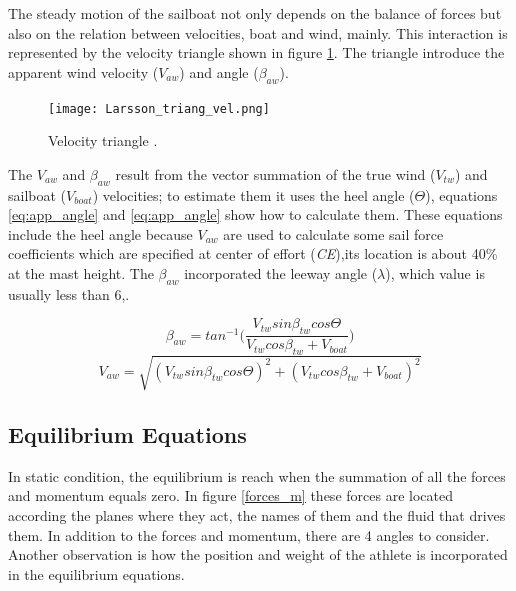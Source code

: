 The steady motion of the sailboat not only depends on the balance of forces but also on the relation between velocities, boat and wind, mainly. This interaction is represented by the velocity triangle shown in figure \ref{vel_triangle}. The triangle introduce the apparent wind velocity ($V_{aw}$) and angle ($\beta_{aw}$).\par 
\begin{figure}[ht]
\centering
  \texttt{[image: Larsson\_triang\_vel.png]}
 \caption{Velocity triangle  \cite{larsonprinciples}. }
\label{vel_triangle}
\end{figure}
The $V_{aw}$ and $\beta_{aw}$ result from the vector summation of the true wind ($V_{tw}$) and sailboat ($V_{boat}$) velocities; to estimate them it uses the heel angle ($\Theta$), equations \ref{eq:app_angle} and \ref{eq:app_angle} show how to calculate them. These equations include the heel angle because $V_{aw}$ are used to calculate some sail force coefficients which are specified at center of effort (\textit{CE}),its location is about 40\% at the mast height. The $\beta_{aw}$ incorporated the leeway angle ($\lambda$), which value is usually less than 6\degree \cite{philpott1993yacht},\cite{claughton1998sailing}. \par
\begin{equation} \label{eq:app_angle}
    \beta_{aw}=tan^{-1} \bigg( \frac{ V_{tw} sin \beta_{tw} cos \Theta }{ V_{tw} cos \beta_{tw} + V_{boat}} \bigg)
\end{equation}
\newline
\begin{equation} \label{eq:ap_vel}
    V_{aw}=  \sqrt{ (V_{tw} sin \beta_{tw} cos \Theta)^2 + (V_{tw} cos \beta_{tw} + V_{boat})^2}
\end{equation}
\subsection {Equilibrium Equations} \label{section_equil_equat}
In static condition, the equilibrium is reach when the summation of all the forces and momentum equals zero. In figure \ref{forces_m} these forces are located according the planes where they act, the names of them and the fluid that drives them. In addition to the forces and momentum, there are 4 angles to consider. Another observation is how the position and weight of the athlete is incorporated in the equilibrium equations. \par 


